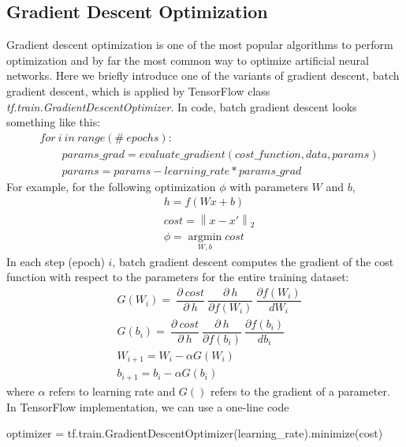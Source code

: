 \documentclass[12pt]{report} %
\newcommand{\norm}[1]{\left\lVert #1 \right\rVert}
\begin{document}
\subsection{Gradient Descent Optimization}
Gradient descent optimization\cite{GDO} is one of the most popular algorithms to perform optimization and by far the most common way to optimize artificial neural networks. Here we briefly introduce one of the variants of gradient descent, batch gradient descent, which is applied by TensorFlow class \textit{tf.train.GradientDescentOptimizer}\cite{TFGDO}. In code, batch gradient descent looks something like this:
\begin{equation}
\begin{split}
&for\ i\ in\ range ( \#\ epochs ): \\
&\qquad params\_grad = evaluate\_gradient ( cost\_function , data , params ) \\
&\qquad params = params - learning\_rate * params\_grad
\end{split}
\end{equation}
For example, for the following optimization $\phi$ with parameters $W$ and $b$,
\begin{equation}
\begin{split}
&h=f(Wx +b)\\
&cost=\norm{x-x'}_2\\
&\phi=\operatorname*{argmin}_{W,b}cost
\end{split}
\end{equation}
In each step (epoch) $i$, batch gradient descent computes the gradient of the cost function with respect to the parameters for the entire training dataset:
\begin{equation}
\begin{split}
&G({W_i})=\ \dfrac{\partial\ cost}{\partial\ h}\ \dfrac{\partial\ h}{\partial f(W_i)}\ \dfrac{\partial f(W_i)}{dW_i} \\
&G({b_i}) =\ \dfrac{\partial\ cost}{\partial\ h}\ \dfrac{\partial\ h}{\partial f(b_i)}\ \dfrac{\partial f(b_i)}{db_i} \\
&W_{i+1}=W_i - \alpha G(W_i) \\
&b_{i+1}=b_i - \alpha G(b_i)
\end{split}
\end{equation}
where $\alpha$ refers to learning rate and $G()$ refers to the gradient of a parameter. In TensorFlow implementation, we can use a one-line code
\begin{center}
	optimizer = tf.train.GradientDescentOptimizer(learning\_rate).minimize(cost)
\end{center}
\end{document}
